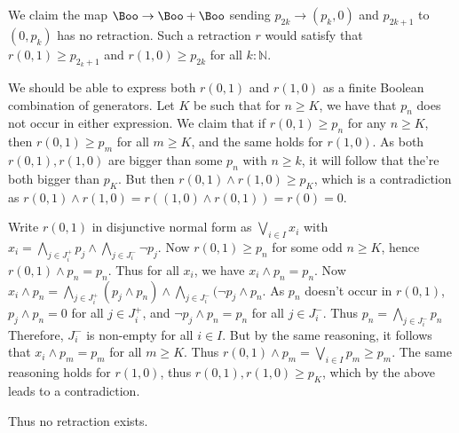 We claim the map $\Boo \to \Boo+ \Boo$ sending $p_{2k} \to (p_k,0)$ and 
$p_{2k+1}$ to $(0,p_k)$ has no retraction. 
Such a retraction $r$ would satisfy that $r(0,1)\geq p_{2_k+1}$ and
$r(1,0) \geq p_{2k}$ for all $k:\mathbb N$. 

We should be able to express both $r(0,1)$ and $r(1,0)$ as a finite 
Boolean combination of generators. 
Let $K$ be such that for $n\geq K$, we have that 
$p_n$ does not occur in either expression.
We claim that if $r(0,1)\geq p_n$ for any $n\geq K$, then 
$r(0,1) \geq p_m$ for all $m\geq K$, and the same holds for $r(1,0)$. 
As both $r(0,1),r(1,0)$ are bigger than some $p_n$ with $n\geq k$, 
it will follow that the're both bigger than $p_K$. 
But then $r(0,1) \wedge r(1,0) \geq p_K$, which is 
a contradiction as $r(0,1) \wedge r(1,0) = r ((1,0)\wedge r(0,1)) = r (0) = 0$. 

Write $r(0,1)$ in disjunctive normal form as $\bigvee_{i\in I} x_i$
with $x_i = \bigwedge_{j\in J_i^+} p_j \wedge \bigwedge_{j\in J_i^-} \neg p_j$. 
Now $r(0,1) \geq p_n$ for some odd $n\geq K$, 
hence $r(0,1) \wedge p_n = p_n$. 
Thus for all $x_i$, we have $x_i \wedge p_n = p_n$. 
Now $x_i \wedge p_n = \bigwedge_{j\in J_i^+} (p_j\wedge p_n) 
\wedge \bigwedge_{j\in J_i^-} (\neg p_j \wedge p_n$. 
As $p_n$ doesn't occur in $r(0,1)$, $p_j \wedge p_n = 0$ for all $j\in J_i^+$, and
$\neg p_j \wedge p_n = p_n$ for all $j \in J_i^-$. 
Thus $p_n = \bigwedge_{j \in J_i^-} p_n$
Therefore, $J_i^-$ is non-empty for all $i\in I$. 
But by the same reasoning, it follows that $x_i \wedge p_m = p_m$ 
for all $m\geq K$. 
Thus $r(0,1) \wedge p_m = \bigvee_{i\in I} p_m \geq p_m$. 
The same reasoning holds for $r(1,0)$, thus 
$r(0,1) , r(1,0)\geq p_K$, which by the above leads to a contradiction. 

Thus no retraction exists. 
